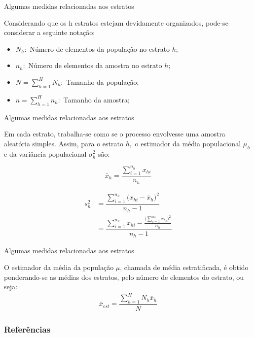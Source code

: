 \documentclass[14pt,aspectratio=1610]{beamer}
\begin{document}
\begin{frame}{Algumas medidas relacionadas aos estratos}
    \begin{block}{}
    \justifying
Considerando que os h estratos estejam devidamente organizados, pode-se
considerar a seguinte notação:
\begin{itemize}[label={}]
    \item $N_{h}:$ Número de elementos da população no estrato $h$;\pause
    \item $n_{h}:$ Número de elementos da amostra no estrato $h$;\pause
    \item $N=\displaystyle{\sum_{h=1}^{H}N_{h}}:$ Tamanho da população;\pause
    \item $n=\displaystyle{\sum_{h=1}^{H}n_{h}}:$ Tamanho da amostra;
\end{itemize}
 \end{block}
\end{frame}

\begin{frame}{Algumas medidas relacionadas aos estratos}
    \begin{block}{}
    \justifying
Em cada estrato, trabalha-se como se o processo envolvesse uma amostra
aleatória simples. Assim, para o estrato $h,$ o estimador da média populacional $\mu_{h}$ e da variância populacional $\sigma_{h}^{2}$ são:
\begin{minipage}[t]{0.45\textwidth}
\smallskip
$$\bar{x}_{h}=\dfrac{\displaystyle{\sum_{i=1}^{n_h}x_{hi}}}{n_{h}}$$
\end{minipage}
\begin{minipage}[t]{0.5\textwidth}
\begin{align*}
s_{h}^{2}&=\dfrac{\displaystyle{\sum_{i=1}^{n_h}\Big(x_{hi}-\bar{x}_{h}\Big)^{2}}}{n_{h}-1}\\
&=\dfrac{\displaystyle{\sum_{i=1}^{n_h}x_{hi}-\frac{\Big(\displaystyle{\sum_{i=1}^{n_{h}}x_{hi}}\Big)^{2}}{n_{h}}}}{n_{h}-1}  
\end{align*}
\end{minipage}
    \end{block}
\end{frame}

\begin{frame}{Algumas medidas relacionadas aos estratos}
\begin{block}{}
\justifying
O estimador da média da população $\mu$, chamada de média estratificada, é obtido ponderando-se as médias dos estratos, pelo número de elementos do estrato, ou seja:
\begin{align*}
\bar{x}_{est}=\dfrac{\displaystyle{\sum_{h=1}^{H}N_{h}\bar{x}_{h}}}{N}
\end{align*}
\end{block}
\nocite{Apostila}
\end{frame}

\begin{frame}%
\frametitle{\bf Referências}
\printbibliography
\end{frame}
\end{document}

